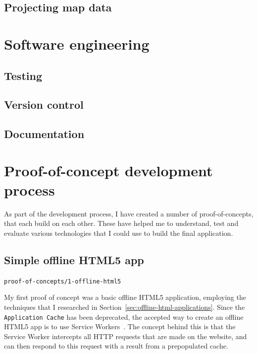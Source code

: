 \documentclass[]{final_report}
\begin{document}


\section{Projecting map data}\label{sec:projecting-map-data}



\chapter{Software engineering}

\section{Testing}

\section{Version control}

\section{Documentation}

\chapter{Proof-of-concept development process}


As part of the development process, I have created a number of proof-of-concepts, that each build on each other. These have helped me to understand, test and evaluate various technologies that I could use to build the final application.

\section{Simple offline HTML5 app}

\hfill \texttt{proof-of-concepts/1-offline-html5}

My first proof of concept was a basic offline HTML5 application, employing the techniques that I researched in Section~\ref{sec:offline-html-applications}. Since the \texttt{Application Cache} has been deprecated, the accepted way to create an offline HTML5 app is to use Service Workers~\cite{w3c-service-workers-caches}. The concept behind this is that the Service Worker intercepts all HTTP requests that are made on the website, and can then respond to this request with a result from a prepopulated cache.
\end{document}
